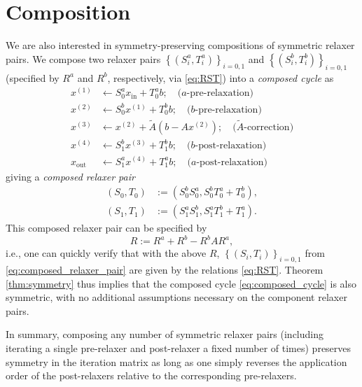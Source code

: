 \documentclass{article}
\begin{document}
\section{Composition}

We are also interested in symmetry-preserving compositions of symmetric relaxer pairs. We compose two relaxer pairs $\left\{ \left( S^a_i, T^a_i \right) \right\}_{i = 0,1}$ and $\left\{ \left( S^b_i, T^b_i \right) \right\}_{i = 0,1}$ (specified by $R^a$ and $R^b$, respectively, via \eqref{eq:RST}) into a \emph{composed cycle} as
\begin{equation} \label{eq:composed_cycle}
\begin{split}
x^{(1)} & \leftarrow S^a_0 x_{\text{in}} + T^a_0 b; \quad \text{($a$-pre-relaxation)} \\
x^{(2)} & \leftarrow S^b_0 x^{(1)} + T^b_0 b; \quad \text{($b$-pre-relaxation)} \\
x^{(3)} & \leftarrow x^{(2)} + \widetilde{A} \left( b - A x^{(2)} \right); \quad \text{($\widetilde{A}$-correction)} \\
x^{(4)} & \leftarrow S^b_1 x^{(3)} + T^b_1 b; \quad \text{($b$-post-relaxation)} \\
x_{\text{out}} & \leftarrow S^a_1 x^{(4)} + T^a_1 b; \quad \text{($a$-post-relaxation)}
\end{split}
\end{equation}
giving a \emph{composed relaxer pair}
\begin{subequations} \label{eq:composed_relaxer_pair}
\begin{align}
\left( S_0, T_0 \right) & := \left( S^b_0 S^a_0, S^b_0 T^a_0 + T^b_0 \right), \\
\left( S_1, T_1 \right) & := \left( S^a_1 S^b_1, S^a_1 T^b_1 + T^a_1 \right).
\end{align}
\end{subequations}
This composed relaxer pair can be specified by
\begin{equation} \label{eq:composed_R}
R := R^a + R^b - R^b A R^a,
\end{equation}
i.e., one can quickly verify that with the above $R$, $\left\{ \left( S_i, T_i \right) \right\}_{i = 0,1}$ from \eqref{eq:composed_relaxer_pair} are given by the relations \eqref{eq:RST}. Theorem \ref{thm:symmetry} thus implies that the composed cycle \eqref{eq:composed_cycle} is also symmetric, with no additional assumptions necessary on the component relaxer pairs.

In summary, composing any number of symmetric relaxer pairs (including iterating a single pre-relaxer and post-relaxer a fixed number of times) preserves symmetry in the iteration matrix as long as one simply reverses the application order of the post-relaxers relative to the corresponding pre-relaxers.
\end{document}
